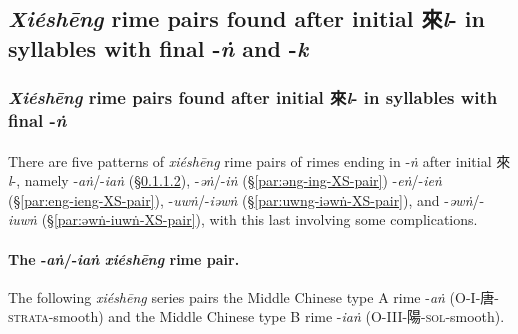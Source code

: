 \subsection{\textit{Xiéshēng} rime pairs found after initial 來\textit{l}- in syllables with final -\textit{ṅ} and -\textit{k}}

\subsubsection{\textit{Xiéshēng} rime pairs found after initial 來\textit{l}- in syllables with final -\textit{ṅ}}
\label{subsubsec:xiesheng_l_ng}

\paragraph{} 
There are five patterns of \textit{xiéshēng} rime pairs of rimes ending in -\textit{ṅ} after initial 來 \textit{l}-, namely -\textit{aṅ}/-\textit{iaṅ} (§\ref{par:ang-iang-XS-pair}),  
-\textit{əṅ}/-\textit{iṅ} (§\ref{par:əng-ing-XS-pair})
 -\textit{eṅ}/-\textit{ieṅ} 
(§\ref{par:eng-ieng-XS-pair}), 
-\textit{uwṅ}/-\textit{iəwṅ}
(§\ref{par:uwng-iəwṅ-XS-pair}), and 
-\textit{əwṅ}/-\textit{iuwṅ} 
(§\ref{par:əwṅ-iuwṅ-XS-pair}), with this last involving some complications. 

\paragraph{The -\textit{aṅ}/-\textit{iaṅ} \textit{xiéshēng} rime pair.}
\label{par:ang-iang-XS-pair}
The following \textit{xiéshēng} series pairs the Middle Chinese type A rime -\textit{aṅ} (O-I-唐-\textsc{strata}-smooth) and the Middle Chinese type B rime -\textit{iaṅ} (O-III-陽-\textsc{sol}-smooth). 




